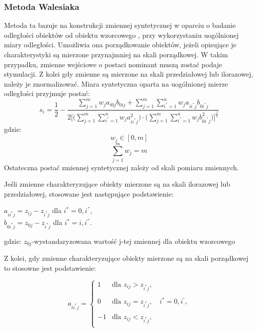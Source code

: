 \documentclass[12pt,a4paper]{report}
\begin{document}
\subsubsection{Metoda Walesiaka}
\noindent


Metoda ta bazuje na konstrukcji zmiennej syntetycznej w oparciu o badanie odległości obiektów od obiektu wzorcowego , przy wykorzystaniu uogólnionej miary odległości. Umożliwia ona  porządkowanie obiektów, jeżeli opisujące je charakterystyki są mierzone przynajmniej na skali porządkowej. W takim przypadku, zmienne wejściowe o postaci nominant muszą zostać podaje stymulacji. Z kolei gdy zmienne są mierzone na skali przedziałowej lub ilorazowej, należy je znormalizować. 
Miara syntetyczna oparta na uogólnionej mierze odległości przyjmuje postać:
\begin{equation}
s_i=\frac{1}{2}-\frac{\sum_{j=1}^{m} w_{j}a_{i0j}b_{0ij} + \sum_{j=1}^{m}\sum_{i^{''}=1}^{n} w_{j}a_{ii^{''}j}b_{0i^{''}j}}{2\bigg[\bigg(\sum_{j=1}^{m}\sum_{i^{''}=1}^{n} w_{j}a^{2}_{ii^{''}j} \bigg)\cdot \bigg(\sum_{j=1}^{m}\sum_{i^{''}=1}^{n} w_{j}b^{2}_{0i^{''}j}\bigg) \bigg]^{\frac{1}{2} }}
\end{equation}
gdzie:
$$w_{j} \in [0, m]$$
$$\sum_{j=1}^{m} w_{j}=m$$
\newline
Ostateczna postać zmiennej syntetycznej zależy od skali pomiaru zmiennych. 

Jeśli zmienne charakteryzujące obiekty mierzone są na skali ilorazowej lub przedziałowej, stosowane jest następujące podstawienie:
\begin{center}
$a_{ii^{*}j}=z_{ij} - z_{i^{*}j}$ dla $i^{*}=0,i^{''},$\\
$b_{0i^{*}j}=z_{0j}-z_{i^*j}$ dla $i^{*}=i,i^{''}$.
\end{center}
gdzie:
\newline
$z_{0j}$-wystandaryzowana wartość j-tej zmiennej dla obiektu wzorcowego

Z kolei, gdy zmienne charakteryzujące obiekty mierzone są na skali porządkowej to stosowne jest podstawienie:

\begin{equation}
a_{ii^{*}j}=\left\{ \begin{array}{lll}
1  & \textrm{dla  } z_{ij}>z_{i^{*}j},\\\\
0 & \textrm{dla } z_{ij}=z_{i^{*}j}, \quad i^{*}=0,i^{'},\\\\
-1 & \textrm{dla } z_{ij}<z_{i^{*}j},\\
\end{array} \right.
\end{equation}
\end{document}
